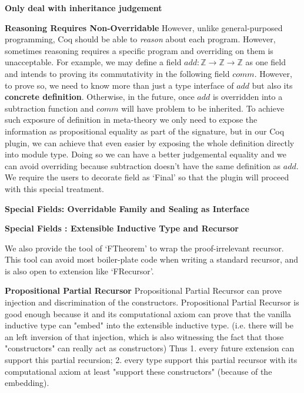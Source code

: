 \textbf{Only deal with inheritance judgement} 



\textbf{Reasoning Requires Non-Overridable}
However, unlike general-purposed programming, Coq should be able to  \textit{reason} about each program. However, sometimes reasoning requires a specific program and overriding on them is unacceptable. For example, we may define a field $add : \mathbb{Z} \to \mathbb{Z} \to \mathbb{Z}$ as one field and intends to proving its commutativity in the following field $comm$. However, to prove so, we need to know more than just a type interface of $add$ but also its \textbf{concrete definition}. Otherwise, in the future, once $add$ is overridden into a subtraction function and $comm$ will have problem to be  inherited. To achieve such exposure of definition in meta-theory we only need to expose the information as propositional equality as part of the signature, but in our Coq plugin, we can achieve that even easier by exposing the whole definition directly into module type. Doing so we can have a better judgemental equality and we can avoid overriding because subtraction doesn't have the same definition as $add$. We require the users to decorate field as `Final' so that the plugin will proceed with this special treatment.

\textbf{Special Fields: Overridable Family and Sealing as Interface}



\textbf{Special Fields : Extensible Inductive Type and Recursor}

We also provide the tool of `FTheorem' to wrap the proof-irrelevant recursor. This tool can avoid most boiler-plate code when writing a standard recursor, and is also open to extension like `FRecursor'.

\textbf{Propositional Partial Recursor}
Propositional Partial Recursor can prove injection and discrimination of the constructors.
Propositional Partial Recursor is good enough because it and its computational axiom can prove that the vanilla inductive type can "embed" into the extensible inductive type. 
(i.e. there will be an left inversion of that injection, which is also witnessing the fact that those "constructors" can really act as constructors) 
Thus 1. every future extension can support this partial recursion; 2. every type support this partial recursor with its computational axiom at least "support these constructors" (because of the embedding).